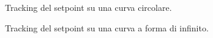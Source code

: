 \documentclass[11pt]{article}
\begin{document}
\begin{figure}[h!]
\centering
{}
\caption{Tracking del setpoint su una curva circolare.} \label{fig:cerchio}
\end{figure}
\begin{figure}[h!]
\centering
{}
\caption{Tracking del setpoint su una curva a forma di infinito.} \label{fig:cerchio}
\end{figure}


\end{document}
